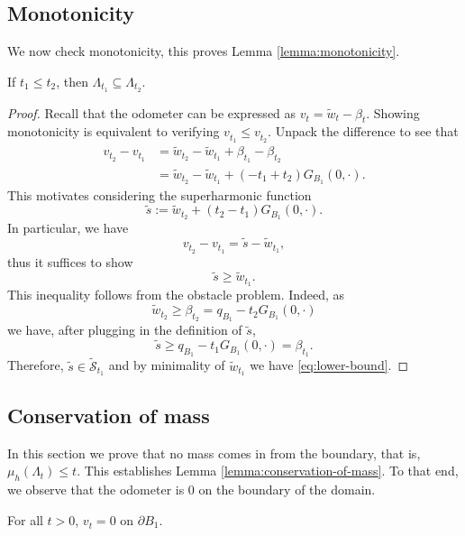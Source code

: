 \documentclass[12pt]{amsart}
\numberwithin{equation}{section}
\newcommand{\mclSshift}[2]{\hyperref[eq:shifted-supersolutions]{\mathcal{\tilde{S}}^{#1}_{#2}}}
\newcommand{\lssshift}[2]{\hyperref[eq:appendix-least-supersolution]{\tilde{w}^{#1}_{#2}}}
\newcommand{\cluster}[2]{\hyperref[eq:non-co-set]{\mathit{\Lambda}^{#1}_{#2}}}
\newcommand{\odometer}[2]{\hyperref[eq:limit-odometer]{v^{#1}_{#2}}}
\begin{document}
	
	
	\subsection{Monotonicity}
	We now check monotonicity, this proves Lemma \ref{lemma:monotonicity}.
	\begin{lemma} \label{lemma:appendix-monotonicity}
		If $t_1 \leq t_2$, then $ \cluster{}{t_1} \subseteq  \cluster{}{t_2}$.
	\end{lemma}
	\begin{proof}
		Recall that the odometer can be expressed as $\odometer{}{t} = \lssshift{}{t} - \beta_t$. 
		Showing monotonicity is equivalent to verifying $\odometer{}{t_1} \leq \odometer{}{t_2}$. 
		Unpack the difference to see that
		\begin{align*}
		\odometer{}{t_2} -  \odometer{}{t_1} &= \lssshift{}{t_2} - \lssshift{}{t_1} + \beta_{t_1} - \beta_{t_2} \\
		&= \lssshift{}{t_2} - \lssshift{}{t_1} + (-t_1+t_2) G_{B_1}(0,\cdot).
		\end{align*}
		This motivates considering the superharmonic function 
		\[
		\tilde{s} := \lssshift{}{t_2} + (t_2 - t_1) G_{B_1}(0,\cdot).
		\]
		In particular, we have 
		\[
		\odometer{}{t_2} - \odometer{}{t_1} = \tilde{s}-\lssshift{}{t_1}, 
		\]
		thus it suffices to show 
		\begin{equation} \label{eq:lower-bound}
		\tilde{s} \geq \lssshift{}{t_1}. 
		\end{equation}
		This inequality follows from the obstacle problem. Indeed, 
		as
		\[
		\lssshift{}{t_2} \geq \beta_{t_2} =  q_{B_1} - t_2 G_{B_1}(0,\cdot)
		\]
		we have, after plugging in the definition of $\tilde{s}$, 
		\[
		\tilde{s} \geq q_{B_1} - t_1 G_{B_1}(0,\cdot) = \beta_{t_1}.
		\]
		Therefore, $\tilde{s} \in \mclSshift{}{t_1}$ and by minimality of $\lssshift{}{t_1}$
		we have \eqref{eq:lower-bound}. 
	\end{proof}
	
	\subsection{Conservation of mass}
	In this section we prove that no mass comes in from the boundary, that is, $\mu_h({\cluster{}{t}}) \leq t$. 
	This establishes Lemma \ref{lemma:conservation-of-mass}. 
	To that end, we observe that the odometer is 0 on the boundary of the domain. 
	
	\begin{lemma} \label{lemma:appendix-zero-boundary}
		For all $t > 0$, $\odometer{}{t} = 0$ on $\partial B_1$.
	\end{lemma}
	
\end{document}
